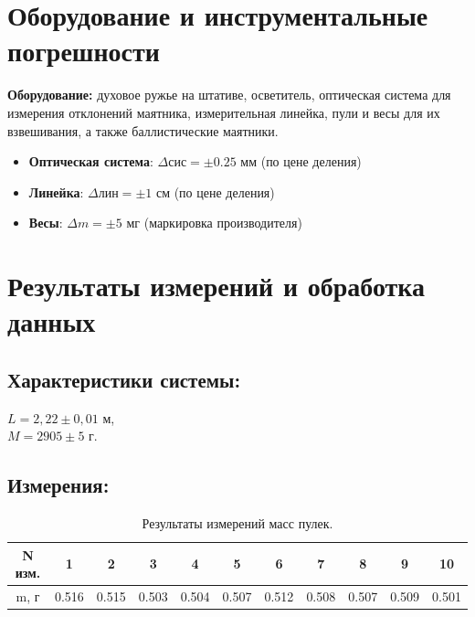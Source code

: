 \documentclass[
	a4paper, %
	12pt, %
]{article}
\begin{document}
	\section{Оборудование и инструментальные погрешности}
	\textbf{Оборудование:} духовое ружье на штативе, осветитель, оптическая система для измерения отклонений маятника, измерительная линейка, пули и весы для их взвешивания, а также баллистические маятники.
	\begin{itemize}
		\item \textbf{Оптическая система}: $\Delta \text{сис} = \pm0.25$ мм (по цене деления)
		\item \textbf{Линейка}: $\Delta \text{лин} = \pm1$ см (по цене деления)
		\item \textbf{Весы}: $\Delta m = \pm{5}$ мг (маркировка производителя)
	\end{itemize}
	
	
	\section{Результаты измерений и обработка данных}
	
	\subsection{Характеристики системы:}
	
	$L = 2,22\pm 0,01$ м,\\
	$M=2905\pm5$ г.
	
	\subsection{Измерения:}
	
	\begin{table}[h]
		\centering
		\begin{tabular}{|c|c|c|c|c|c|c|c|c|c|c|}
			\hline
			N изм. & 1 & 2 & 3 & 4 & 5 & 6 & 7 & 8 & 9 & 10  \\
			\hline
			m, г & 0.516 & 0.515 & 0.503 & 0.504 & 0.507 & 0.512 & 0.508 & 0.507 & 0.509 & 0.501 \\
			\hline
		\end{tabular}
		\caption{Результаты измерений масс пулек.}
		\label{table:1}
	\end{table}
	
	
\end{document}
